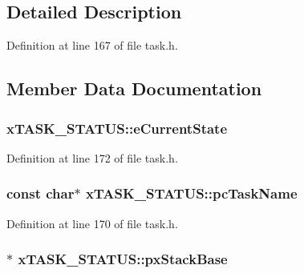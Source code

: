\subsection{Detailed Description}


Definition at line 167 of file task.\+h.



\subsection{Member Data Documentation}
\subsubsection[{\texorpdfstring{e\+Current\+State}{eCurrentState}}]{ x\+T\+A\+S\+K\+\_\+\+S\+T\+A\+T\+U\+S\+::e\+Current\+State}\hypertarget{structx_t_a_s_k___s_t_a_t_u_s_a727e904e3afe49472b0fc6a4e96439cb}{}\label{structx_t_a_s_k___s_t_a_t_u_s_a727e904e3afe49472b0fc6a4e96439cb}


Definition at line 172 of file task.\+h.

\subsubsection[{\texorpdfstring{pc\+Task\+Name}{pcTaskName}}]{\setlength{\rightskip}{0pt plus 5cm}const char$\ast$ x\+T\+A\+S\+K\+\_\+\+S\+T\+A\+T\+U\+S\+::pc\+Task\+Name}\hypertarget{structx_t_a_s_k___s_t_a_t_u_s_ad272663e2560bd9ea088384a39ba6192}{}\label{structx_t_a_s_k___s_t_a_t_u_s_ad272663e2560bd9ea088384a39ba6192}


Definition at line 170 of file task.\+h.

\subsubsection[{\texorpdfstring{px\+Stack\+Base}{pxStackBase}}]{$\ast$ x\+T\+A\+S\+K\+\_\+\+S\+T\+A\+T\+U\+S\+::px\+Stack\+Base}\hypertarget{structx_t_a_s_k___s_t_a_t_u_s_a0ee59674d2cc57d3a5a29c777d5452ed}{}\label{structx_t_a_s_k___s_t_a_t_u_s_a0ee59674d2cc57d3a5a29c777d5452ed}


